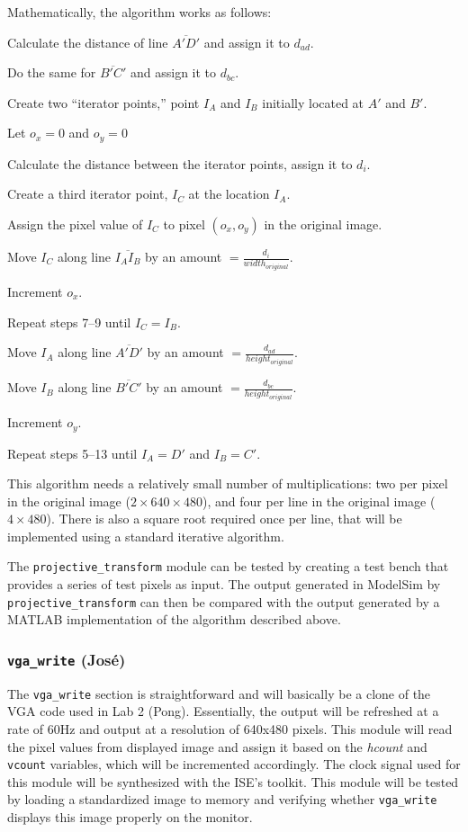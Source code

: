 \documentclass[10pt]{article}
\begin{document}
Mathematically, the algorithm works as follows:
\begin{enumerate*}
\item Calculate the distance of line $\overline{A\prime D\prime}$ and assign it to $d_{ad}$.
\item Do the same for $\overline{B\prime C\prime}$ and assign it to $d_{bc}$.
\item Create two ``iterator points,'' point $I_A$ and $I_B$ initially located at $A\prime$ and $B\prime$.
\item Let $o_x = 0$ and $o_y = 0$
\item Calculate the distance between the iterator points, assign it to $d_i$.
\item Create a third iterator point, $I_C$ at the location $I_A$.
\item Assign the pixel value of $I_C$ to pixel $(o_x, o_y)$ in the original image.
\item Move $I_C$ along line $\overline{I_A I_B}$ by an amount $= \frac{d_i}{width_{original}}$.
\item Increment $o_x$.
\item Repeat steps 7--9 until $I_C = I_B$.
\item Move $I_A$ along line $\overline{A\prime D\prime}$ by an amount $= \frac{d_{ad}}{height_{original}}$.
\item Move $I_B$ along line $\overline{B\prime C\prime}$ by an amount $= \frac{d_{bc}}{height_{original}}$.
\item Increment $o_y$.
\item Repeat steps 5--13 until $I_A = D\prime$ and $I_B = C\prime$.
\end{enumerate*}

This algorithm needs a relatively small number of multiplications: two per pixel in the original image ($2\times640\times480$), and four per line in the original image ($4\times480$). There is also a square root required once per line, that will be implemented using a standard iterative algorithm.

The {\tt projective\_transform} module can be tested by creating a test bench that provides a series of test pixels as input. The output generated in ModelSim by {\tt projective\_transform} can then be compared with the output generated by a MATLAB implementation of the algorithm described above.

\subsubsection{{\tt vga\_write} (Jos\'{e})}
The {\tt vga\_write} section is straightforward and will basically be a clone of the VGA code used in Lab 2 (Pong). Essentially, the output will be refreshed at a rate of 60Hz and output at a resolution of 640x480 pixels. This module will read the pixel values from displayed image and assign it based on the {\it hcount} and {\tt vcount} variables, which will be incremented accordingly. The clock signal used for this module will be synthesized with the ISE's toolkit. This module will be tested by loading a standardized image to memory and verifying whether {\tt vga\_write} displays this image properly on the monitor.
\end{document}
